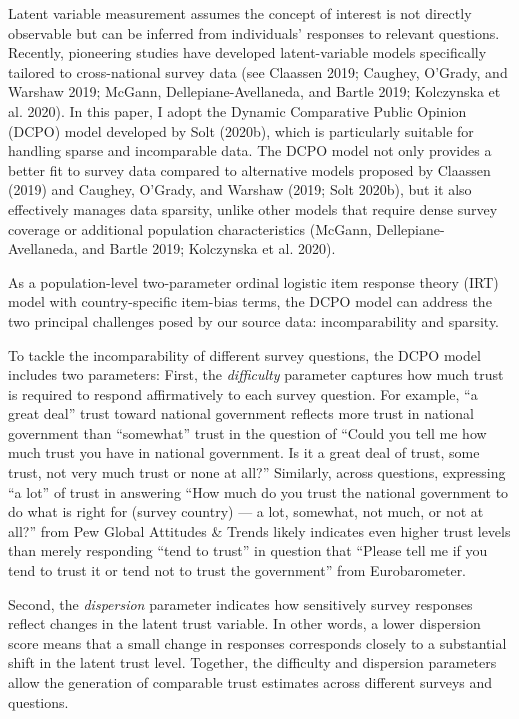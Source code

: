 \documentclass[
  12pt,
]{article}
\begin{document}
Latent variable measurement assumes the concept of interest is not directly observable but can be inferred from individuals' responses to relevant questions.
Recently, pioneering studies have developed latent-variable models specifically tailored to cross-national survey data (see Claassen 2019; Caughey, O'Grady, and Warshaw 2019; McGann, Dellepiane-Avellaneda, and Bartle 2019; Kolczynska et al. 2020).
In this paper, I adopt the Dynamic Comparative Public Opinion (DCPO) model developed by Solt (2020b), which is particularly suitable for handling sparse and incomparable data.
The DCPO model not only provides a better fit to survey data compared to alternative models proposed by Claassen (2019) and Caughey, O'Grady, and Warshaw (2019; Solt 2020b), but it also effectively manages data sparsity, unlike other models that require dense survey coverage or additional population characteristics (McGann, Dellepiane-Avellaneda, and Bartle 2019; Kolczynska et al. 2020).

As a population-level two-parameter ordinal logistic item response theory (IRT) model with country-specific item-bias terms, the DCPO model can address the two principal challenges posed by our source data: incomparability and sparsity.

To tackle the incomparability of different survey questions, the DCPO model includes two parameters:
First, the \emph{difficulty} parameter captures how much trust is required to respond affirmatively to each survey question.
For example, ``a great deal'' trust toward national government reflects more trust in national government than ``somewhat'' trust in the question of ``Could you tell me how much trust you have in national government. Is it a great deal of trust, some trust, not very much trust or none at all?''
Similarly, across questions, expressing ``a lot'' of trust in answering ``How much do you trust the national government to do what is right for (survey country) --- a lot, somewhat, not much, or not at all?'' from Pew Global Attitudes \& Trends likely indicates even higher trust levels than merely responding ``tend to trust'' in question that ``Please tell me if you tend to trust it or tend not to trust the government'' from Eurobarometer.

Second, the \emph{dispersion} parameter indicates how sensitively survey responses reflect changes in the latent trust variable.
In other words, a lower dispersion score means that a small change in responses corresponds closely to a substantial shift in the latent trust level.
Together, the difficulty and dispersion parameters allow the generation of comparable trust estimates across different surveys and questions.
\end{document}
